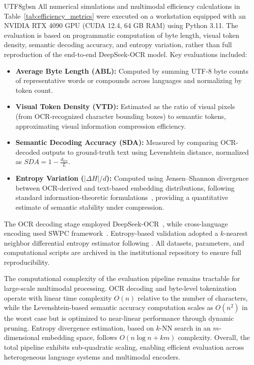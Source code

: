 \documentclass[conference]{IEEEtran}
\begin{document}
\begin{CJK*}{UTF8}{gbsn}
All numerical simulations and multimodal efficiency calculations in Table~\ref{tab:efficiency_metrics} were executed on a workstation equipped with an NVIDIA RTX 4090 GPU (CUDA 12.4, 64 GB RAM) using Python 3.11. The evaluation is based on programmatic computation of byte length, visual token density, semantic decoding accuracy, and entropy variation, rather than full reproduction of the end-to-end DeepSeek-OCR model. Key evaluations included:

\begin{itemize}
    \item \textbf{Average Byte Length (ABL):} Computed by summing UTF-8 byte counts of representative words or compounds across languages and normalizing by token count.
    \item \textbf{Visual Token Density (VTD):} Estimated as the ratio of visual pixels (from OCR-recognized character bounding boxes) to semantic tokens, approximating visual information compression efficiency.
    \item \textbf{Semantic Decoding Accuracy (SDA):} Measured by comparing OCR-decoded outputs to ground-truth text using Levenshtein distance, normalized as $SDA = 1 - \frac{d_{lev}}{L}$.
    \item \textbf{Entropy Variation ($|\Delta H|/d$):} 
Computed using Jensen--Shannon divergence between OCR-derived and text-based embedding distributions, following standard information-theoretic formulations~\cite{lin1991jsd,fuglede2004jsd,mikolov2013distributed}, providing a quantitative estimate of semantic stability under compression.

\end{itemize}

The OCR decoding stage employed DeepSeek-OCR~\cite{wei2025deepseek}, while cross-language encoding used SWPC  framework~\cite{weigang2024six}. Entropy-based validation adopted a $k$-nearest neighbor differential entropy estimator following \cite{belghazi2018mutual}. All datasets, parameters, and computational scripts are archived in the institutional repository to ensure full reproducibility.

The computational complexity of the evaluation pipeline remains tractable for large-scale multimodal processing. OCR decoding and byte-level tokenization operate with linear time complexity $O(n)$ relative to the number of characters, while the Levenshtein-based semantic accuracy computation scales as $O(n^2)$ in the worst case but is optimized to near-linear performance through dynamic pruning. Entropy divergence estimation, based on $k$-NN search in an $m$-dimensional embedding space, follows $O(n \log n + km)$ complexity. Overall, the total pipeline exhibits sub-quadratic scaling, enabling efficient evaluation across heterogeneous language systems and multimodal encoders.


\end{CJK*}
\end{document}
